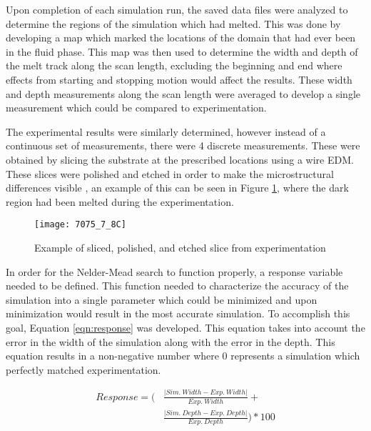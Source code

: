 \label{sim_analysis}

Upon completion of each simulation run, the saved data files were analyzed to determine the regions of the simulation which had melted.  This was done by developing a map which marked the locations of the domain that had ever been in the fluid phase.  This map was then used to determine the width and depth of the melt track along the scan length, excluding the beginning and end where effects from starting and stopping motion would affect the results.  These width and depth measurements along the scan length were averaged to develop a single measurement which could be compared to experimentation.  

The experimental results were similarly determined, however instead of a continuous set of measurements, there were 4 discrete measurements.  These were obtained by slicing the substrate at the prescribed locations using a wire \ac{EDM}.  These slices were polished  and etched  in order to make the microstructural differences visible , an example of this can be seen in Figure \ref{fig:7075_7_8C}, where the dark region had been melted during the experimentation.
\begin{figure}[!htb]
	\centering
	\texttt{[image: 7075\_7\_8C]}
	\caption{Example of sliced, polished, and etched slice from  experimentation}
	\label{fig:7075_7_8C}
\end{figure}

In order for the Nelder-Mead search to function properly, a response variable needed to be defined.  This function needed to characterize the accuracy of the simulation into a single parameter which could be minimized and upon minimization would result in the most accurate simulation.  To accomplish this goal, Equation \ref{eqn:response} was developed.  This equation takes into account the error in the width of the simulation along with the error in the depth.  This equation results in a non-negative number where 0 represents a simulation which perfectly matched experimentation.

\begin{equation}\label{eqn:response}
	\begin{split}
		Response =  \Biggl ( &\frac{\lvert Sim.\ Width - Exp.\ Width \rvert}{Exp.\ Width} + \\ 
		&\frac{\lvert Sim.\ Depth - Exp.\ Depth \rvert}{Exp.\ Depth} \Biggr ) * 100
	\end{split}
\end{equation}